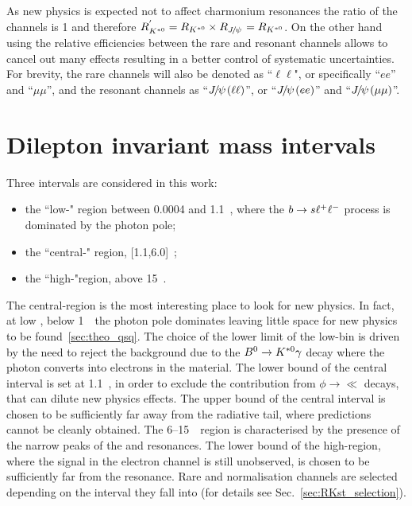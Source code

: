 
As new physics is expected not to affect charmonium resonances the ratio of the \jpsi channels
is 1 and therefore $R_{\Kstarz}^{'} = R_{\Kstarz} \times R_{\jpsi} = R_{\Kstarz}$.
On the other hand using the relative efficiencies between the rare and resonant channels
allows to cancel out many effects resulting in a better control of systematic uncertainties.  
For brevity, the rare channels will also be denoted as ``$\ell\ell$", or
specifically ``$ee$'' and ``$\mu\mu$'', and the resonant channels as ``$\jpsi(\ell\ell)$'',
or ``$\jpsi(ee)$'' and ``$\jpsi(\mu\mu)$''.

\section{Dilepton invariant mass intervals}
\label{sec:RKst_q2_choice}

Three \qsq intervals are considered in this work: 
\begin{itemize}
\item the ``low-\qsq" region between 0.0004 and 1.1~\gevgevcccc, where the ${b}\rightarrow{\ensuremath{s}}\ell^+ \ell^-$ process is dominated by the photon pole;
\item the ``central-\qsq" region, [1.1,6.0]~\gevgevcccc;
\item the ``high-\qsq "region, above 15~\gevgevcccc.
\end{itemize}
%
The central-\qsq region is the most interesting place to look for new physics. In fact, at low \qsq, below 
1~\gevgevcccc~the photon pole dominates leaving little space for new physics to be found~\ref{sec:theo_qsq}.
The choice of the lower limit of the low-\qsq bin is driven by the need to reject the background due to the ${{B}^0}\rightarrow{\ensuremath{{K}^{*0}}}\gamma$
decay where the photon converts into electrons in the material.
The lower bound of the central interval is set at 1.1~\gevgevcccc, in order to exclude the contribution
from $\phi\to\ll$ decays, that can dilute new physics effects.
The upper bound of the central interval is chosen to be sufficiently far away from the \jpsi radiative
tail, where predictions cannot be cleanly obtained. The 6--15~\gevgevcccc~region is characterised by the presence
of the narrow peaks of the \jpsi and \psitwos resonances. The lower bound of the high-\qsq region, where
the signal in the electron channel is still unobserved, is chosen to be sufficiently far from the \psitwos resonance.
Rare and normalisation channels are selected depending on the \qsq interval they fall into (for details see Sec.~\ref{sec:RKst_selection}).

